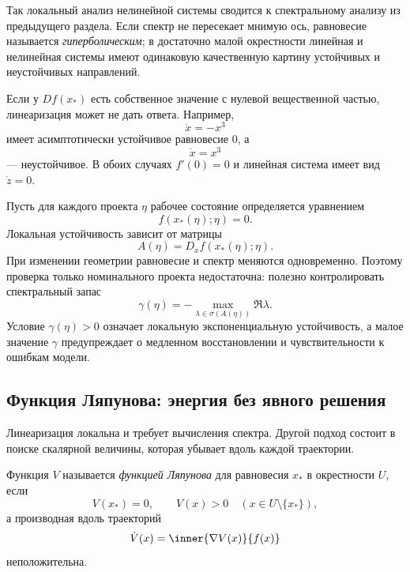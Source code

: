 Так локальный анализ нелинейной системы сводится к спектральному анализу из предыдущего раздела. Если спектр не пересекает мнимую ось, равновесие называется \emph{гиперболическим}; в достаточно малой окрестности линейная и нелинейная системы имеют одинаковую качественную картину устойчивых и неустойчивых направлений.

\begin{caution}
Если у $Df(x_*)$ есть собственное значение с нулевой вещественной частью, линеаризация может не дать ответа. Например,
\[
\dot x=-x^3
\]
имеет асимптотически устойчивое равновесие $0$, а
\[
\dot x=x^3
\]
--- неустойчивое. В обоих случаях $f'(0)=0$ и линейная система имеет вид $\dot z=0$.
\end{caution}

\begin{application}
Пусть для каждого проекта $\eta$ рабочее состояние определяется уравнением
\[
f(x_*(\eta);\eta)=0.
\]
Локальная устойчивость зависит от матрицы
\[
A(\eta)=D_xf(x_*(\eta);\eta).
\]
При изменении геометрии равновесие и спектр меняются одновременно. Поэтому проверка только номинального проекта недостаточна: полезно контролировать спектральный запас
\begin{equation}
\label{eq:stability-margin-design-v03}
\gamma(\eta)
=
-\max_{\lambda\in\sigma(A(\eta))}\Re\lambda.
\end{equation}
Условие $\gamma(\eta)>0$ означает локальную экспоненциальную устойчивость, а малое значение $\gamma$ предупреждает о медленном восстановлении и чувствительности к ошибкам модели.
\end{application}

\subsection{Функция Ляпунова: энергия без явного решения}

Линеаризация локальна и требует вычисления спектра. Другой подход состоит в поиске скалярной величины, которая убывает вдоль каждой траектории.

\begin{definition}
Функция $V$ называется \emph{функцией Ляпунова} для равновесия $x_*$ в окрестности $U$, если
\begin{equation}
\label{eq:lyapunov-positive-v03}
V(x_*)=0,
\qquad
V(x)>0
\quad
(x\in U\setminus\{x_*\}),
\end{equation}
а производная вдоль траекторий
\begin{equation}
\label{eq:lyapunov-orbital-derivative-v03}
\dot V(x)
=
\inner{\grad V(x)}{f(x)}
\end{equation}
неположительна.
\end{definition}

